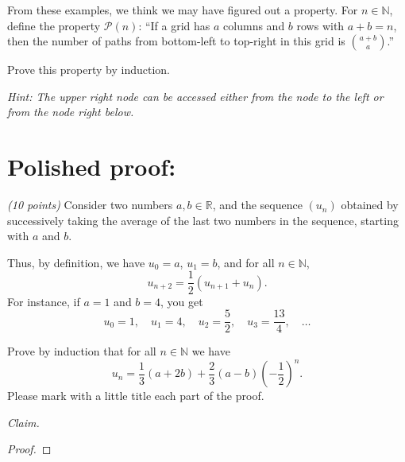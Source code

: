 \documentclass[12pt]{article}
\begin{document}
\begin{enumerate}
\begin{center}
\end{center}

From these examples, we think we may have figured out a property. For \( n \in \mathbb{N} \), define the property \( \mathcal{P}(n) \): ``If a grid has \( a \) columns and \( b \) rows with \( a + b = n \), then the number of paths from bottom-left to top-right in this grid is \( \binom{a+b}{a} \).''

Prove this property by induction.

\emph{Hint: The upper right node can be accessed either from the node to the left or from the node right below.} \newline



\end{enumerate}
\newpage %

\section*{Polished proof:} 

\emph{(10 points)} Consider two numbers \( a, b \in \mathbb{R} \), and the sequence \( (u_n) \) obtained by successively taking the average of the last two numbers in the sequence, starting with \( a \) and \( b \). 

Thus, by definition, we have \( u_0 = a \), \( u_1 = b \), and for all \( n \in \mathbb{N} \),
\[
u_{n+2} = \frac12 \left( u_{n+1} + u_n \right).
\]
For instance, if \( a = 1 \) and \( b = 4 \), you get
\[
u_0 = 1, \quad u_1 = 4, \quad u_2 = \frac{5}{2}, \quad u_3 = \frac{13}{4}, \quad \dots
\]

Prove by induction that for all \( n \in \mathbb{N} \) we have
\[
u_n = \frac{1}{3} ( a + 2b) + \frac{2}{3} (a - b) \left( - \frac{1}{2} \right)^n.
\]
Please mark with a little title each part of the proof.



\noindent \emph{Claim.}

\begin{proof}
\end{proof}
\end{document}
